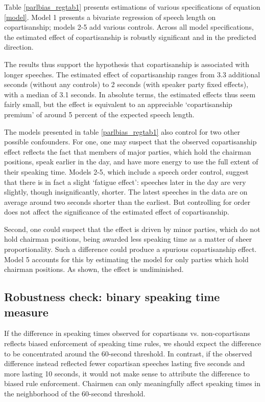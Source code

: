 \documentclass[12pt,a4paper]{article}
\begin{document}
Table \ref{parlbias_regtab1} presents estimations of various specifications of equation \ref{model}. Model 1 presents a bivariate regression of speech length on copartisanship; models 2-5 add various controls. Across all model specifications, the estimated effect of copartisanship is robustly significant and in the predicted direction.



The results thus support the hypothesis that copartisanship is associated with longer speeches. The estimated effect of copartisanship ranges from 3.3 additional seconds (without any controls) to 2 seconds (with speaker party fixed effects), with a median of 3.1 seconds. In absolute terms, the estimated effects thus seem fairly small, but the effect is equivalent to an appreciable `copartisanship premium' of around 5 percent of the expected speech length.

The models presented in table \ref{parlbias_regtab1} also control for two other possible confounders. For one, one may suspect that the observed copartisanship effect reflects the fact that members of major parties, which hold the chairman positions, speak earlier in the day, and have more energy to use the full extent of their speaking time. Models 2-5, which include a speech order control, suggest that there is in fact a slight `fatigue effect': speeches later in the day are very slightly, though insignificantly, shorter. The latest speeches in the data are on average around two seconds shorter than the earliest. But controlling for order does not affect the significance of the estimated effect of copartisanship.

Second, one could suspect that the effect is driven by minor parties, which do not hold chairman positions, being awarded less speaking time as a matter of sheer proportionality. Such a difference could produce a spurious copartisanship effect. Model 5 accounts for this by estimating the model for only parties which hold chairman positions. As shown, the effect is undiminished.

\subsection{Robustness check: binary speaking time measure}

If the difference in speaking times observed for copartisans vs. non-copartisans reflects biased enforcement of speaking time rules, we should expect the difference to be concentrated around the 60-second threshold. In contrast, if the observed difference instead reflected fewer copartisan speeches lasting five seconds and more lasting 10 seconds, it would not make sense to attribute the difference to biased rule enforcement. Chairmen can only meaningfully affect speaking times in the neighborhood of the 60-second threshold.
\end{document}
